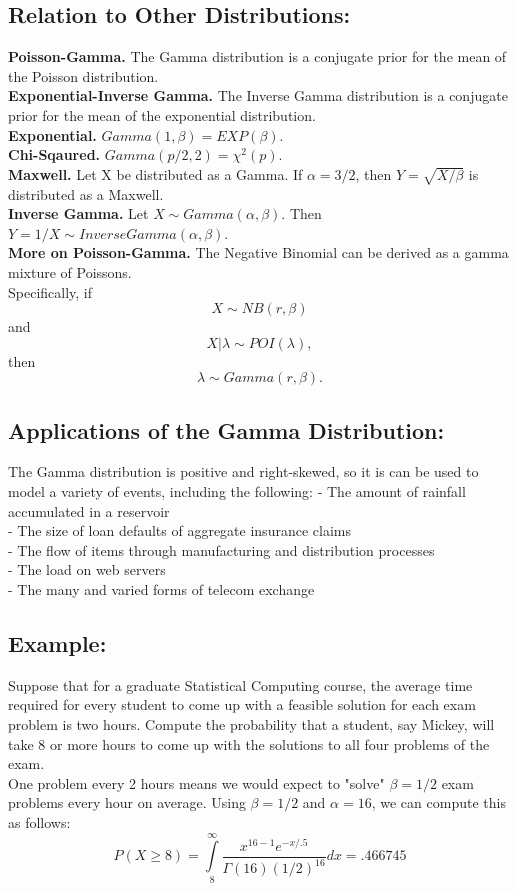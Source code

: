 \documentclass{article}
\begin{document}
  \subsection*{Relation to Other Distributions:}
  \textbf{Poisson-Gamma.} The Gamma distribution is a conjugate prior
  for the mean of the Poisson distribution.\\
  \textbf{Exponential-Inverse Gamma.} The Inverse Gamma distribution is a
  conjugate prior for the mean of the exponential distribution. \\
  \wl
  \textbf{Exponential.} $Gamma(1,\beta) = EXP(\beta)$.\\
  \textbf{Chi-Sqaured.} $Gamma(p/2,2) = \chi ^2 (p)$.\\
  \textbf{Maxwell.} Let X be distributed as a Gamma. If $\alpha = 3/2$, then $Y = \sqrt{X/\beta}$ is distributed as a Maxwell.\\
  \textbf{Inverse Gamma.} Let $X \sim Gamma(\alpha,\beta)$. Then $Y = 1/X \sim InverseGamma(\alpha,\beta)$.\\
  \wl
  \textbf{More on Poisson-Gamma.} The Negative Binomial can be derived as a gamma mixture of Poissons.\\
  \wl
  Specifically, if
  \[
     X \sim NB (r,\beta)
  \]
  and
  \[
    X|\lambda \sim POI(\lambda),
  \]
  then
  \[
    \lambda \sim Gamma(r,\beta).
  \]


  \subsection*{Applications of the Gamma Distribution:}
  The Gamma distribution is positive and right-skewed, so it is can be used to model a variety of events, including the following:
    \wl
    \wl
    - The amount of rainfall accumulated in a reservoir\\
    - The size of loan defaults of aggregate insurance claims\\
    - The flow of items through manufacturing and distribution processes\\
    - The load on web servers\\
    - The many and varied forms of telecom exchange

  \subsection*{Example:}
  Suppose that for a graduate Statistical Computing course, the average time required for every student to come up with a feasible solution for each exam problem is two hours. Compute the probability that a student, say Mickey, will take 8 or more hours to come up with the solutions to all four problems of the exam.\\
\wl
One problem every 2 hours means we would expect to "solve" $\beta = 1/2$ exam problems every hour on average. Using $\beta = 1/2 $ and $\alpha = 16$, we can compute this as follows:
\[
  P(X \ge 8) = \int\limits_8^\infty {\frac{x^{16-1}e^{-x/.5}}{\Gamma(16)(1/2)^{16} }dx}
             = .466745
\]
\end{document}
